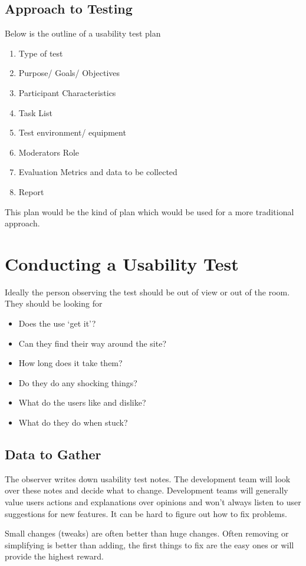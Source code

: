\subsection*{Approach to Testing}
Below is the outline of a usability test plan
\begin{enumerate}
    \item Type of test
    \item Purpose/ Goals/ Objectives
    \item Participant Characteristics
    \item Task List
    \item Test environment/ equipment
    \item Moderators Role
    \item Evaluation Metrics and data to be collected
    \item Report
\end{enumerate}
This plan would be the kind of plan which would be used for a more traditional approach.

\section*{Conducting a Usability Test}
Ideally the person observing the test should be out of view or out of the room. They should be looking for
\begin{itemize}
    \item Does the use `get it'?
    \item Can they find their way around the site?
    \item How long does it take them?
    \item Do they do any shocking things?
    \item What do the users like and dislike?
    \item What do they do when stuck?
\end{itemize}

\subsection*{Data to Gather}
The observer writes down usability test notes. The development team will look over these notes and decide what to change. Development teams will generally value users actions and explanations over opinions and won't always listen to user suggestions for new features. It can be hard to figure out how to fix problems. 

Small changes (tweaks) are often better than huge changes. Often removing or simplifying is better than adding, the first things to fix are the easy ones or will provide the highest reward. 

